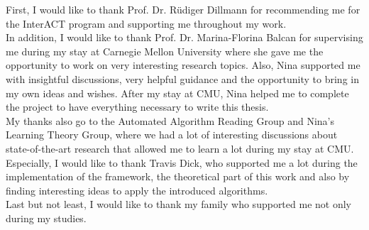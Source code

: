 \acks

First, I would like to thank Prof. Dr. Rüdiger Dillmann for recommending me for the InterACT program and supporting me throughout my work.\\

In addition, I would like to thank Prof. Dr. Marina-Florina Balcan for supervising me during my stay at Carnegie Mellon University where she gave me the opportunity to work on very interesting research topics. Also, Nina supported me with insightful discussions, very helpful guidance and the opportunity to bring in my own ideas and wishes. After my stay at CMU, Nina helped me to complete the project to have everything necessary to write this thesis.\\

My thanks also go to the Automated Algorithm Reading Group and Nina's Learning Theory Group, where we had a lot of interesting discussions about state-of-the-art research that allowed me to learn a lot during my stay at CMU. Especially, I would like to thank Travis Dick, who supported me a lot during the implementation of the framework, the theoretical part of this work and also by finding interesting ideas to apply the introduced algorithms.\\

Last but not least, I would like to thank my family who supported me not only during my studies.